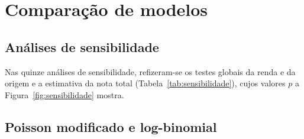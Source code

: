 \documentclass[12pt,a4paper]{article}
\newcommand{\tabela}[1]{\sbox\caixatabela{}%
  \ifdim\wd\caixatabela>\linewidth \resizebox{\linewidth}{!}{\usebox\caixatabela}%
  \else\ifdim\dimexpr\ht\caixatabela+\dp\caixatabela\relax>0.80\textheight
    \resizebox*{!}{0.80\textheight}{\usebox\caixatabela}%
  \else\usebox\caixatabela\fi\fi}
\begin{document}
\section{Comparação de modelos}
\label{apendice:comparacao}

\subsection*{Análises de sensibilidade}

Nas quinze análises de sensibilidade, refizeram-se os testes globais da renda e da origem e a estimativa da nota total (Tabela~\ref{tab:sensibilidade}), cujos valores $p$ a Figura~\ref{fig:sensibilidade} mostra.

\begin{table}[H]
  \centering
  \caption[Análises de sensibilidade do modelo principal]{Análises de sensibilidade do modelo principal. ``$p$ renda'' e
  ``$p$ origem'' são os testes globais da renda e da origem; ``RR nota total'' é o RR por 100 pontos; na linha da regressão logística, ele vem da padronização marginal. $^{a}$Sem as matrículas que saíram no 1º semestre sem nenhum registro no histórico desse semestre, exceto na coorte de 2020. $^{b}$Critério de renda das cotas até 2023.}
  \label{tab:sensibilidade}
  \tabela{tab_art_sensibilidade.tex}
\end{table}

\subsection*{Poisson modificado e log-binomial}
\end{document}
